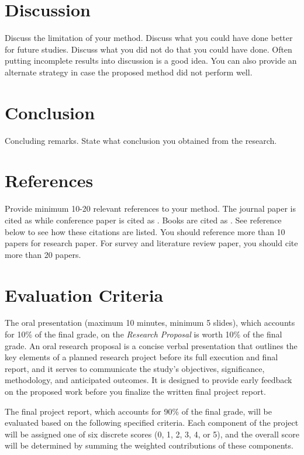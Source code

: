 \documentclass[12pt,portrait]{article}
\begin{document}
\section{Discussion}
Discuss the limitation of your method. Discuss what you could have done better for future studies. Discuss what you did not do that you could have done. Often putting incomplete results into discussion is a good idea. You can also provide   an alternate strategy in case the proposed method did not perform well.


\section{Conclusion}
Concluding remarks. State what conclusion you obtained from the research. 

\section{References}
Provide minimum 10-20 relevant references to your method. The journal paper is cited as \citet{chung.2001.NI} while conference paper is cited as \citet{chung.2003.CVPR}. Books are cited as \citet{chung.2012.CNA}. See reference below to see how these citations are listed. You should reference more than 10 papers for research paper. For survey and literature review paper, you should cite more than 20 papers. 




\newpage 
\section{Evaluation Criteria}


The oral presentation (maximum 10 minutes, minimum 5 slides), which accounts for 10\% of the final grade,  on the {\it Research Proposal} is worth 10\% of the final grade. An oral research proposal is a concise verbal presentation that outlines the key elements of a planned research project before its full execution and final report, and it serves to communicate the study’s objectives, significance, methodology, and anticipated outcomes. It is designed to provide early feedback on the proposed work before you finalize the written final project report. 


The final project report, which accounts for 90\% of the final grade, will be evaluated based on the following specified criteria. Each component of the project will be assigned one of six discrete scores (0, 1, 2, 3, 4, or 5), and the overall score will be determined by summing the weighted contributions of these components.
\end{document}
